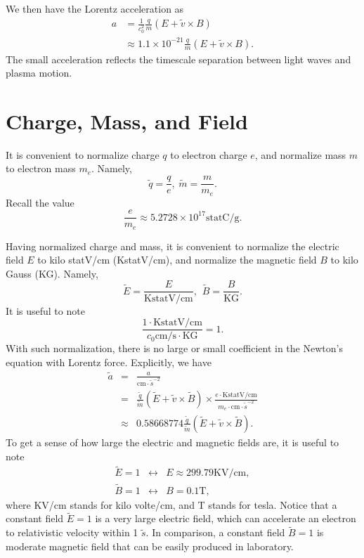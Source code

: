 \documentclass[paper=a4, fontsize=11pt]{scrartcl} %
\numberwithin{equation}{section} %
\numberwithin{figure}{section} %
\numberwithin{table}{section} %
\begin{document}
We then have the Lorentz acceleration as
\begin{align}
	a &= \frac{1}{c_0^2} \frac{q}{m} \left( E + \tilde{v} \times B \right)\\
	&\approx 1.1\times 10^{-21} \frac{q}{m} \left( E + \tilde{v} \times B \right).
\end{align}
The small acceleration reflects the timescale separation between light waves and plasma motion.

\section*{Charge, Mass, and Field}
It is convenient to normalize charge $q$ to electron charge $e$, and normalize mass $m$ to electron mass $m_e$. Namely,
\begin{equation}
	\tilde{q}=\frac{q}{e},\hspace{3pt} \tilde{m}=\frac{m}{m_e}.
\end{equation}
Recall the value
\begin{equation}
	\frac{e}{m_e}\approx 5.2728\times10^{17} \text{statC}/\text{g}.
\end{equation}

Having normalized charge and mass, it is convenient to normalize the electric field $E$ to kilo statV/cm (KstatV/cm), and normalize the magnetic field $B$ to kilo Gauss (KG). Namely,
\begin{equation}
	\tilde{E}=\frac{E}{\text{KstatV/cm}},\hspace{5pt} \tilde{B}=\frac{B}{\text{KG}}.
\end{equation}
It is useful to note
\begin{equation}
	\frac{1\cdot\text{KstatV/cm}}{c_0 \text{cm/s}\cdot\text{KG}}=1.
\end{equation}
With such normalization, there is no large or small coefficient in the Newton's equation with Lorentz force. Explicitly, we have
\begin{eqnarray}
	\tilde{a}&=&\frac{a}{\text{cm}\cdot\tilde{s}^{-2}} \\
                 &=& \frac{\tilde{q}}{\tilde{m}}(\tilde{E}+\tilde{v}\times\tilde{B})
			\times\frac{e\cdot\text{KstatV/cm}}{m_e\cdot\text{cm}\cdot\tilde{s}^{-2}} \\
                 &\approx& 0.58668774 \frac{\tilde{q}}{\tilde{m}}(\tilde{E}+\tilde{v}\times\tilde{B}).
\end{eqnarray}
To get a sense of how large the electric and magnetic fields are, it is useful to note
\begin{eqnarray}
	\tilde{E}=1&\leftrightarrow& E\approx 299.79\text{KV/cm},\\
	\tilde{B}=1&\leftrightarrow& B=0.1\text{T},
\end{eqnarray}
where KV/cm stands for kilo volte/cm, and T stands for tesla. Notice that a constant field $\tilde{E}=1$ is a very large electric field, which can accelerate an electron to relativistic velocity within 1 $\tilde{s}$. In comparison, a constant field $\tilde{B}=1$ is moderate magnetic field that can be easily produced in laboratory.
\end{document}
